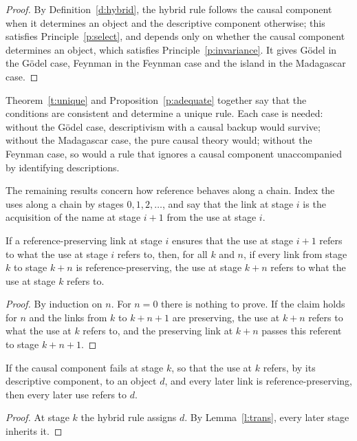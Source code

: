 \documentclass{situationist-preprint}
\begin{document}
\begin{proof}
By Definition~\ref{d:hybrid}, the hybrid rule follows the causal component when it determines an object and the descriptive component otherwise; this satisfies Principle~\ref{p:select}, and depends only on whether the causal component determines an object, which satisfies Principle~\ref{p:invariance}. It gives G\"odel in the G\"odel case, Feynman in the Feynman case and the island in the Madagascar case.
\end{proof}

Theorem~\ref{t:unique} and Proposition~\ref{p:adequate} together say that the conditions are consistent and determine a unique rule. Each case is needed: without the G\"odel case, descriptivism with a causal backup would survive; without the Madagascar case, the pure causal theory would; without the Feynman case, so would a rule that ignores a causal component unaccompanied by identifying descriptions.

The remaining results concern how reference behaves along a chain. Index the uses along a chain by stages $0, 1, 2, \dots$, and say that the link at stage $i$ is the acquisition of the name at stage $i+1$ from the use at stage $i$.

\begin{lemma}[Transmission]\label{l:trans}
If a reference-preserving link at stage $i$ ensures that the use at stage $i+1$ refers to what the use at stage $i$ refers to, then, for all $k$ and $n$, if every link from stage $k$ to stage $k+n$ is reference-preserving, the use at stage $k+n$ refers to what the use at stage $k$ refers to.
\end{lemma}

\begin{proof}
By induction on $n$. For $n=0$ there is nothing to prove. If the claim holds for $n$ and the links from $k$ to $k+n+1$ are preserving, the use at $k+n$ refers to what the use at $k$ refers to, and the preserving link at $k+n$ passes this referent to stage $k+n+1$.
\end{proof}

\begin{corollary}\label{c:break}
If the causal component fails at stage $k$, so that the use at $k$ refers, by its descriptive component, to an object $d$, and every later link is reference-preserving, then every later use refers to $d$.
\end{corollary}

\begin{proof}
At stage $k$ the hybrid rule assigns $d$. By Lemma~\ref{l:trans}, every later stage inherits it.
\end{proof}
\end{document}
